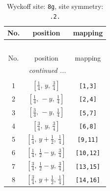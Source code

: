 \documentclass[fleqn,8pt]{jsarticle}
\begin{document}
\renewcommand{\arraystretch}{1.2}
\begin{longtable}{ccc}
\caption{Wyckoff site: {\tt 8g}, site symmetry: {\tt .2.}}
 \\
 \hline \hline
No. & position & mapping \\ \hline \endfirsthead

\multicolumn{2}{l}{\tablename\ \thetable{}} \\
 \hline \hline
No. & position & mapping \\ \hline \endhead

 \hline \hline
\multicolumn{2}{r}{\footnotesize\it continued ...} \\ \endfoot

 \hline \hline
\multicolumn{2}{r}{} \\ \endlastfoot

1 & $\left[ \frac{1}{4},\, y,\, \frac{3}{4} \right]$ & {\tt [1,3]} \\ \hline
2 & $\left[ \frac{1}{4},\, - y,\, \frac{1}{4} \right]$ & {\tt [2,4]} \\ \hline
3 & $\left[ \frac{3}{4},\, - y,\, \frac{1}{4} \right]$ & {\tt [5,7]} \\ \hline
4 & $\left[ \frac{3}{4},\, y,\, \frac{3}{4} \right]$ & {\tt [6,8]} \\ \hline
5 & $\left[ \frac{1}{4},\, y + \frac{1}{2},\, \frac{1}{4} \right]$ & {\tt [9,11]} \\ \hline
6 & $\left[ \frac{1}{4},\, \frac{1}{2} - y,\, \frac{3}{4} \right]$ & {\tt [10,12]} \\ \hline
7 & $\left[ \frac{3}{4},\, \frac{1}{2} - y,\, \frac{3}{4} \right]$ & {\tt [13,15]} \\ \hline
8 & $\left[ \frac{3}{4},\, y + \frac{1}{2},\, \frac{1}{4} \right]$ & {\tt [14,16]} \\
\end{longtable}
\renewcommand{\arraystretch}{1.2}
\end{document}

